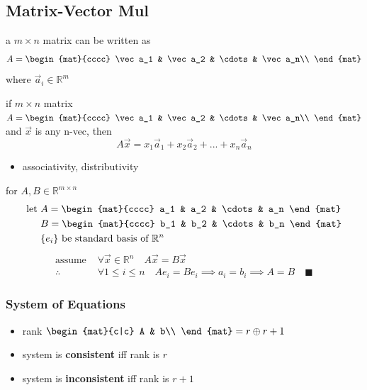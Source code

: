 	\subsection{Matrix-Vector Mul}
		\begin{definition}
			a $m\times n$ matrix can be written as
			$$A=\begin{mat}{cccc} \vec a_1 & \vec a_2 & \cdots & \vec a_n\\ \end{mat}$$
			where $\vec a_i\in\mathbb{R}^m$
		\end{definition}
		\begin{definition}[\texttt{[m,n] * [n] -> [m]}]
			if $m\times n$ matrix $A=\begin{mat}{cccc} \vec a_1 & \vec a_2 & \cdots & \vec a_n\\ \end{mat}$ and $\vec x$ is any n-vec, then
			$$A\vec x=x_1\vec a_1+x_2\vec a_2+...+x_n\vec a_n$$
			\begin{itemize}
				\item associativity, distributivity 
			\end{itemize}
		\end{definition}
		\begin{example}[Prove $\forall \vec x\in\mathbb{R}^n\quad A\vec x=B\vec x\implies A=B$]\label{sec:standard-basis}
			for $A,B\in\mathbb{R}^{m\times n}$
			\begin{align*}
				\text{let }&A=\begin{mat}{cccc} a_1 & a_2 & \cdots & a_n \end{mat}\\
				   &B=\begin{mat}{cccc} b_1 & b_2 & \cdots & b_n \end{mat}\\
				   &\{e_i\}\text{ be standard basis of }\mathbb{R}^n
			\end{align*}
			\begin{align*}
				\text{assume }&\forall\vec x\in\mathbb{R}^n\quad A\vec x=B\vec x\\
				\therefore&\forall1\le i\le n\quad Ae_i=Be_i\implies a_i=b_i\implies A=B\quad\blacksquare
			\end{align*}
		\end{example}
		\subsubsection{System of Equations}
			\begin{theorem}[let $A\vec x=\vec{b}$ be a system of equations and rank $A=r$]
				\begin{itemize}
					\item rank $\begin{mat}{c|c}
						A & b\\
					\end{mat} = r \oplus r+1$
					\item system is \textbf{consistent} iff rank is $r$
					\item system is \textbf{inconsistent} iff rank is $r+1$
				\end{itemize}
			\end{theorem}
